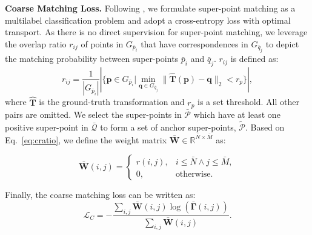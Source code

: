 \noindent\textbf{Coarse Matching Loss.}
Following \cite{yu2021cofinet,fu2021robust}, we formulate super-point matching as a multilabel classification problem and adopt a cross-entropy loss with optimal transport. As there is no direct supervision for super-point matching, we leverage the overlap ratio $r_{ij}$ of points in $G_{\bar{p}_i}$ that have correspondences in $G_{\bar{q}_j}$ to depict the matching probability between super-points $\bar{p}_i$ and $\bar{q}_j$. $r_{ij}$ is defined as:
\begin{equation}\label{eq:cratio}
r_{ij} =\frac{1}{{|G_{\bar{p}_i}|}} {|\{\bm{p}\in G_{\bar{p}_i}\big|\min_{\bm{q}\in G_{\bar{q}_j}}\|\hat{\bm{T}}\left(\bm{p}\right) -\bm{q}\|_2<r_p\}|},
\end{equation}
where $\hat{\bm{T}}$ is the ground-truth transformation and $r_p$ is a set threshold.
All other pairs are omitted. We select the super-points in $\bm{\bar{\mathcal{P}}}$ which have at least one positive super-point in $\bm{\bar{\mathcal{Q}}}$ to form a set of anchor super-points, $\bm{\tilde{\mathcal{P}}}$. 
Based on Eq.~\eqref{eq:cratio}, we define the weight matrix $\mathbf{\bar{W}} \in \mathbb{R}^{\bar{N} \times \bar{M}}$ as:
\begin{scriptsize}
\begin{equation*}
    \mathbf{\bar{W}}\left(i, j\right){=} 
    \begin{cases}
    r\left(i, j\right),  & i \leq \bar{N} \wedge j \leq \bar{M}, \\  
    0, & \text {otherwise.}
    \end{cases}
\end{equation*}
\end{scriptsize}
Finally, the coarse matching loss can be written as:
\begin{equation}
\mathcal{L}_C=-\frac{\sum_{i, j} \mathbf{\bar{W}}\left(i, j\right) \log \left(\mathbf{\bar{\Gamma}}\left(i, j\right)\right)}{\sum_{i, j} \mathbf{\bar{W}}\left(i, j\right)}.
\end{equation}

